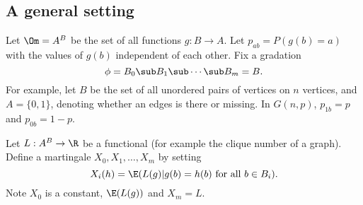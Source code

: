 \subsection{A general setting}
Let $\Om=A^B$ be the set of all functions $g:B\to A$. Let $p_{ab}=P(g(b)=a)$ with the values of $g(b)$ independent of each other. Fix a gradation
\[
\phi=B_0\sub B_1\sub\cdots \sub B_m=B.
\]
For example, let $B$ be the set of all unordered pairs of vertices on $n$ vertices, and $A=\{0,1\}$, denoting whether an edges is there or missing. In $G(n,p)$, $p_{1b}=p$ and $p_{0b}=1-p$.

Let $L:A^B\to \R$ be a functional (for example the clique number of a graph). Define a martingale $X_0,X_1,\ldots, X_m$ by setting 
\[
X_i(h)=\E(L(g)|g(b)=h(b)\text{ for all }b\in B_i).
\]
Note $X_0$ is a constant, $\E(L(g))$ and $X_m=L$. 

